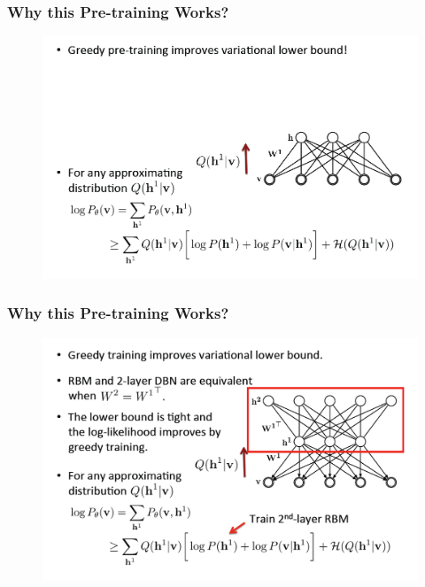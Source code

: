 \documentclass{beamer}
\begin{document}
\begin{frame}
\frametitle{Why this Pre-training Works?}
\begin{figure}
      \includegraphics[width=1\textwidth]{figs/rbm34.png}
\end{figure}
\end{frame}

\begin{frame}
\frametitle{Why this Pre-training Works?}
\begin{figure}
      \includegraphics[width=1\textwidth]{figs/rbm35.png}
\end{figure}
\end{frame}
\end{document}
